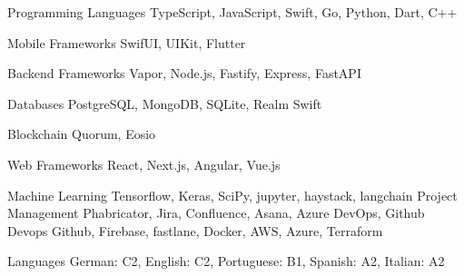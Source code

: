 

\begin{cvskills}

\cvskill
{Programming Languages} %
{TypeScript, JavaScript, Swift, Go, Python, Dart, C++} %
\vspace{0.4cm}

\cvskill
{Mobile Frameworks} %
{SwifUI, UIKit, Flutter} %
\vspace{0.4cm}

\cvskill
{Backend Frameworks} %
{Vapor, Node.js, Fastify, Express, FastAPI} %
\vspace{0.4cm}

\cvskill
{Databases} %
{PostgreSQL, MongoDB, SQLite, Realm Swift} %
\vspace{0.4cm}

\cvskill
{Blockchain} %
{Quorum, Eosio} %
\vspace{0.4cm}

\cvskill
{Web Frameworks} %
{React, Next.js, Angular, Vue.js} %
\vspace{0.4cm}

\cvskill
{Machine Learning} %
{Tensorflow, Keras, SciPy, jupyter, haystack, langchain} %
\vspace{0.4cm}
\cvskill
{Project Management} %
{Phabricator, Jira, Confluence, Asana, Azure DevOps, Github} %
\vspace{0.4cm}
\cvskill
{Devops} %
{Github, Firebase, fastlane, Docker, AWS, Azure, Terraform} %
\vspace{0.4cm}


\cvskill
{Languages} %
{German: C2, English: C2, Portuguese: B1, Spanish: A2, Italian: A2} %


\end{cvskills}
